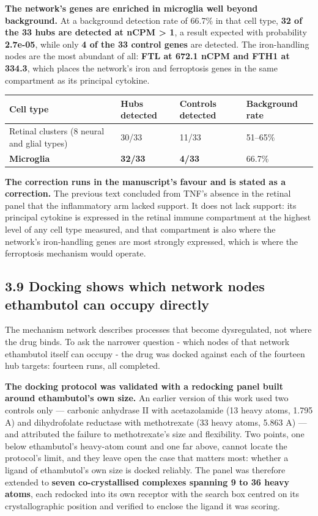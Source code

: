 \documentclass[utf8]{FrontiersinVancouver}
\begin{document}
\textbf{The network's genes are enriched in microglia well beyond background.} At a background detection rate of 66.7\% in that cell type, \textbf{32 of the 33 hubs are detected at nCPM > 1}, a result expected with probability \textbf{2.7e-05}, while only \textbf{4 of the 33 control genes} are detected. The iron-handling nodes are the most abundant of all: \textbf{FTL at 672.1 nCPM and FTH1 at 334.3}, which places the network's iron and ferroptosis genes in the same compartment as its principal cytokine.

\begin{table}[htbp]
\centering
\begin{tabular}{llll}
\hline
Cell type & Hubs detected & Controls detected & Background rate \\
\hline
Retinal clusters (8 neural and glial types) & 30/33 & 11/33 & 51--65\% \\
\textbf{Microglia} & \textbf{32/33} & \textbf{4/33} & 66.7\% \\
\hline
\end{tabular}
\end{table}

\textbf{The correction runs in the manuscript's favour and is stated as a correction.} The previous text concluded from TNF's absence in the retinal panel that the inflammatory arm lacked support. It does not lack support: its principal cytokine is expressed in the retinal immune compartment at the highest level of any cell type measured, and that compartment is also where the network's iron-handling genes are most strongly expressed, which is where the ferroptosis mechanism would operate.

\subsection{3.9 Docking shows which network nodes ethambutol can occupy directly}

The mechanism network describes processes that become dysregulated, not where the drug binds. To ask the narrower question - which nodes of that network ethambutol itself can occupy - the drug was docked against each of the fourteen hub targets: fourteen runs, all completed.

\textbf{The docking protocol was validated with a redocking panel built around ethambutol's own size.} An earlier version of this work used two controls only --- carbonic anhydrase II with acetazolamide (13 heavy atoms, 1.795 A) and dihydrofolate reductase with methotrexate (33 heavy atoms, 5.863 A) --- and attributed the failure to methotrexate's size and flexibility. Two points, one below ethambutol's heavy-atom count and one far above, cannot locate the protocol's limit, and they leave open the case that matters most: whether a ligand of ethambutol's own size is docked reliably. The panel was therefore extended to \textbf{seven co-crystallised complexes spanning 9 to 36 heavy atoms}, each redocked into its own receptor with the search box centred on its crystallographic position and verified to enclose the ligand it was scoring.
\end{document}
